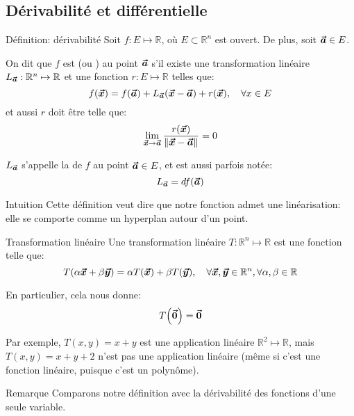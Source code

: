 \documentclass[a4paper]{article}
\begin{document}
\subsection{Dérivabilité et différentielle}
\begin{parag}{Définition: dérivabilité}
    Soit $f: E \mapsto \mathbb{R}$, où $E \subset \mathbb{R}^n$ est ouvert. De plus, soit $\bm{\protect\vec{a}} \in E$.

    On dit que $f$ est  (ou ) au point $\bm{\protect\vec{a}}$ s'il existe une transformation linéaire $L_{\bm{\protect\vec{a}}} : \mathbb{R}^n \mapsto \mathbb{R}$ et une fonction $r: E \mapsto \mathbb{R}$ telles que: 
    \[f\left(\bvec{x}\right) = f\left(\bvec{a}\right) + L_{\bvec{a}}\left(\bvec{x} - \bvec{a}\right) + r\left(\bvec{x}\right), \mathspace\forall x \in E\]
    et aussi $r$ doit être telle que: 
    \[\lim_{\bvec{x} \to \bvec{a}} \frac{r\left(\bvec{x}\right)}{\left\|\bvec{x} - \bvec{a}\right\|} = 0\]
    
    $L_{\bm{\protect\vec{a}}}$ s'appelle la  de $f$ au point $\bm{\protect\vec{a}} \in E$, et est aussi parfois notée: 
    \[L_{\bvec{a}} = df\left(\bvec{a}\right)\]

    \begin{subparag}{Intuition}
        Cette définition veut dire que notre fonction admet une linéarisation: elle se comporte comme un hyperplan autour d'un point.
    \end{subparag}
    
    \begin{subparag}{Transformation linéaire}
        Une transformation linéaire $T : \mathbb{R}^n \mapsto \mathbb{R}$ est une fonction telle que: 
        \[T\left(\alpha \bvec{x} + \beta \bvec{y}\right) = \alpha T\left(\bvec{x}\right) + \beta T\left(\bvec{y}\right), \mathspace \forall \bvec{x}, \bvec{y} \in \mathbb{R}^n, \forall \alpha, \beta \in \mathbb{R}\]
         
        En particulier, cela nous donne: 
        \[T\left(\bvec{0}\right) = \bvec{0}\]
        
        Par exemple, $T\left(x, y\right) = x + y$ est une application linéaire $\mathbb{R}^2 \mapsto \mathbb{R}$, mais $T\left(x, y\right) = x + y + 2$ n'est pas une application linéaire (même si c'est une fonction linéaire, puisque c'est un polynôme).
    \end{subparag}

    \begin{subparag}{Remarque}
        Comparons notre définition avec la dérivabilité des fonctions d'une seule variable. 


\end{subparag}
\end{parag}
\end{document}
